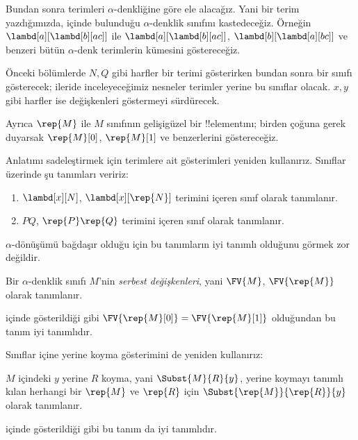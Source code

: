 \documentclass[../../../include/open-logic-section]{subfiles}
\begin{document}

Bundan sonra terimleri $\alpha$-denkliğine göre ele alacağız. Yani bir terim
yazdığımızda, içinde bulunduğu $\alpha$-denklik sınıfını kastedeceğiz.
Örneğin $\lambd[a][\lambd[b][a c]]$ ile
$\lambd[a][\lambd[b][a c]]$, $\lambd[b][\lambd[a][b c]]$ ve benzeri bütün
$\alpha$-denk terimlerin kümesini göstereceğiz.

Önceki bölümlerde $N,Q$ gibi harfler bir terimi gösterirken bundan sonra bir
sınıfı gösterecek; ileride inceleyeceğimiz nesneler terimler yerine bu
sınıflar olacak. $x,y$ gibi harfler ise değişkenleri göstermeyi sürdürecek.

Ayrıca $\rep{M}$ ile $M$ sınıfının gelişigüzel bir !!{element}{}ını;
birden çoğuna gerek duyarsak $\rep{M}[0]$, $\rep{M}[1]$ ve benzerlerini
göstereceğiz.

Anlatımı sadeleştirmek için terimlere ait gösterimleri yeniden kullanırız.
Sınıflar üzerinde şu tanımları veririz:
\begin{defn}
  \begin{enumerate}
  \item $\lambd[x][N]$, $\lambd[x][\rep{N}]$ terimini içeren sınıf olarak
    tanımlanır.
  \item $PQ$, $\rep{P}\rep{Q}$ terimini içeren sınıf olarak tanımlanır.
  \end{enumerate}
\end{defn}

$\alpha$-dönüşümü bağdaşır olduğu için bu tanımların iyi tanımlı olduğunu
görmek zor değildir.

\begin{defn} 
  Bir $\alpha$-denklik sınıfı $M$'nin \emph{serbest değişkenleri}, yani
  $\FV{M}$, $\FV{\rep{M}}$ olarak tanımlanır.
\end{defn}

 içinde gösterildiği gibi
$\FV{\rep{M}[0]}=\FV{\rep{M}[1]}$ olduğundan bu tanım iyi tanımlıdır.

Sınıflar içine yerine koyma gösterimini de yeniden kullanırız:
\begin{defn} 
  $M$ içindeki $y$ yerine $R$ koyma, yani $\Subst{M}{R}{y}$, yerine koymayı
  tanımlı kılan herhangi bir $\rep{M}$ ve $\rep{R}$ için
  $\Subst{\rep{M}}{\rep{R}}{y}$ olarak tanımlanır.
\end{defn}

 içinde gösterildiği gibi bu tanım da iyi tanımlıdır.
\end{document}
